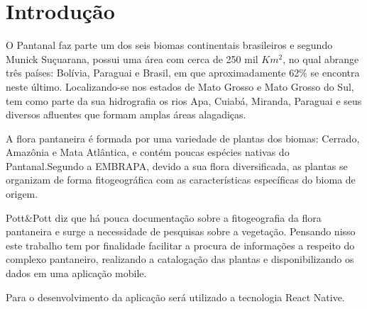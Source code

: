 \chapter{Introdução}




O Pantanal faz parte  um dos seis biomas continentais brasileiros e segundo Munick Suçuarana, possui uma área com cerca de 250 mil $Km^{2}$, no qual abrange três países: Bolívia, Paraguai e Brasil, em que aproximadamente 62\% se encontra neste último. Localizando-se nos estados de Mato Grosso e Mato Grosso do Sul, tem como parte da sua hidrografia os rios Apa, Cuiabá, Miranda, Paraguai e seus diversos afluentes que formam amplas áreas alagadiças.

A flora pantaneira é formada por uma variedade de plantas dos biomas: Cerrado, Amazônia e Mata Atlântica, e contém poucas espécies nativas do Pantanal.Segundo a EMBRAPA, devido a sua flora diversificada, as plantas se organizam de forma fitogeográfica com as características específicas do bioma de origem.

Pott\&Pott diz que há pouca documentação sobre a fitogeografia da flora pantaneira e surge a necessidade de pesquisas sobre a vegetação. Pensando nisso este trabalho tem por finalidade facilitar a procura de informações a respeito do complexo pantaneiro, realizando a catalogação das plantas e disponibilizando os dados em uma aplicação mobile.

Para o desenvolvimento da aplicação será utilizado a tecnologia React Native.

